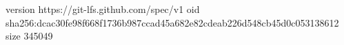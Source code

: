 version https://git-lfs.github.com/spec/v1
oid sha256:dcac30fe98f668f1736b987ccad45a682e82cdeab226d548cb45d0c053138612
size 345049
